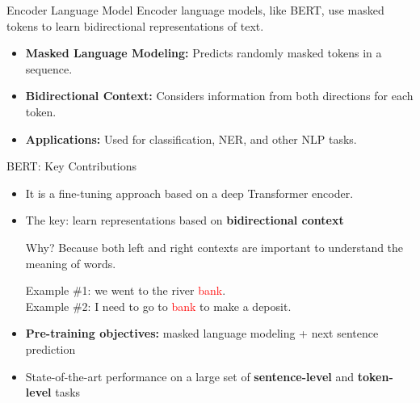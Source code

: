 \documentclass[serif, aspectratio=169]{beamer}
\begin{document}
\begin{frame}{Encoder Language Model}
    Encoder language models, like BERT, use masked tokens to learn bidirectional representations of text.
    \vspace{0.5cm}
    \begin{itemize}
        \item \textbf{Masked Language Modeling:} Predicts randomly masked tokens in a sequence.
        \item \textbf{Bidirectional Context:} Considers information from both directions for each token.
        \item \textbf{Applications:} Used for classification, NER, and other NLP tasks.
    \end{itemize}
\end{frame}

\begin{frame}{BERT: Key Contributions}
    
    \vspace{0.5cm}
    
    \begin{itemize}
        \item It is a fine-tuning approach based on a deep Transformer encoder.
        
        \vspace{0.3cm}
        
        \item The key: learn representations based on \textbf{bidirectional context}
        
        \vspace{0.2cm}
        
        \textcolor{green!50!black}{
        Why? Because both left and right contexts are important to understand the meaning of words.}
        
        \vspace{0.2cm}
        
        Example \#1: we went to the river \textcolor{red}{bank}. \\
        Example \#2: I need to go to \textcolor{red}{bank} to make a deposit.
        
        \vspace{0.5cm}
        
        \item \textbf{Pre-training objectives:} masked language modeling + next sentence prediction
        
        \vspace{0.3cm}
        
        \item State-of-the-art performance on a large set of \textbf{sentence-level} and \textbf{token-level} tasks
    \end{itemize}
    
\end{frame}
\end{document}
